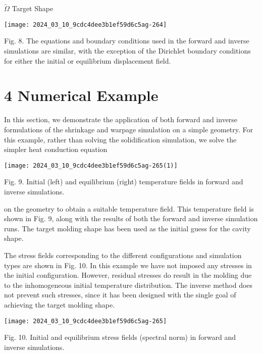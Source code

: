 \documentclass[10pt]{article}
\begin{document}
$\tilde{\Omega}$ Target Shape

\begin{center}
\texttt{[image: 2024\_03\_10\_9cdc4dee3b1ef59d6c5ag-264]}
\end{center}

Fig. 8. The equations and boundary conditions used in the forward and inverse simulations are similar, with the exception of the Dirichlet boundary conditions for either the initial or equilibrium displacement field.

\section*{4 Numerical Example}
In this section, we demonstrate the application of both forward and inverse formulations of the shrinkage and warpage simulation on a simple geometry. For this example, rather than solving the solidification simulation, we solve the simpler heat conduction equation

\begin{center}
\texttt{[image: 2024\_03\_10\_9cdc4dee3b1ef59d6c5ag-265(1)]}
\end{center}

Fig. 9. Initial (left) and equilibrium (right) temperature fields in forward and inverse simulations.

on the geometry to obtain a suitable temperature field. This temperature field is shown in Fig. 9, along with the results of both the forward and inverse simulation runs. The target molding shape has been used as the initial guess for the cavity shape.

The stress fields corresponding to the different configurations and simulation types are shown in Fig. 10. In this example we have not imposed any stresses in the initial configuration. However, residual stresses do result in the molding due to the inhomogeneous initial temperature distribution. The inverse method does not prevent such stresses, since it has been designed with the single goal of achieving the target molding shape.

\begin{center}
\texttt{[image: 2024\_03\_10\_9cdc4dee3b1ef59d6c5ag-265]}
\end{center}

Fig. 10. Initial and equilibrium stress fields (spectral norm) in forward and inverse simulations.
\end{document}
